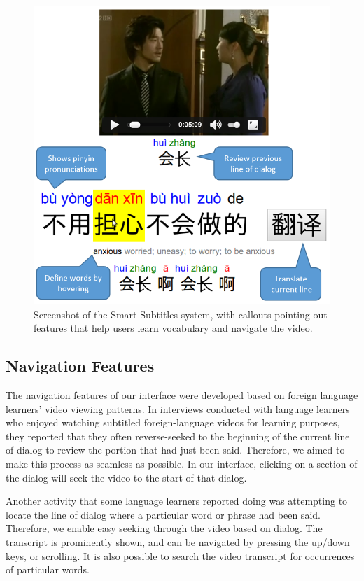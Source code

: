 \documentclass{sigchi}
\begin{document}
\begin{figure}[!h]
\centering
\includegraphics[width=\columnwidth]{smartsubs-features}
\caption{Screenshot of the Smart Subtitles system,
with callouts pointing out features that help users
learn vocabulary and navigate the video.}
\label{fig:figure2}
\end{figure}

\subsection{Navigation Features}

The navigation features of our interface were developed based on foreign language learners' video viewing patterns. In interviews conducted with language learners who enjoyed watching subtitled foreign-language videos for learning purposes, they reported that they often reverse-seeked to the beginning of the current line of dialog to review the portion that had just been said. Therefore, we aimed to make this process as seamless as possible. In our interface, clicking on a section of the dialog will seek the video to the start of that dialog.

Another activity that some language learners reported doing was attempting to locate the line of dialog where a particular word or phrase had been said. Therefore, we enable easy seeking through the video based on dialog. The transcript is prominently shown, and can be navigated by pressing the up/down keys, or scrolling. It is also possible to search the video transcript for occurrences of particular words.
\end{document}
